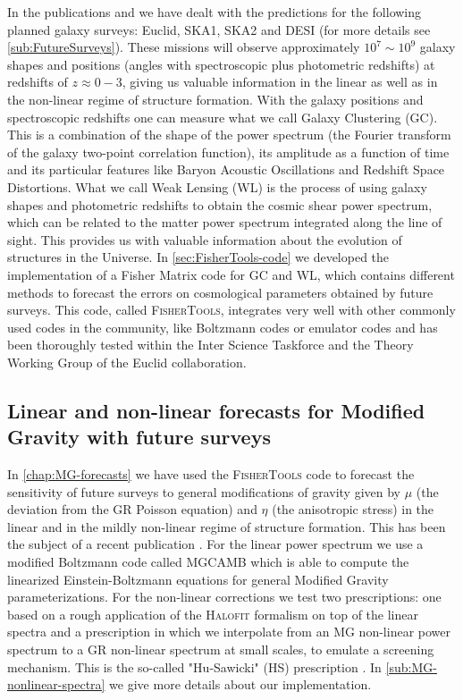 In the publications \cite{casas_fitting_2016} and \cite{casas_linear_2017} we have dealt with the predictions for the following planned galaxy surveys: Euclid, SKA1, SKA2 and DESI (for more details see \cref{sub:FutureSurveys}).
These missions will observe approximately $10^7 \sim 10^9$ galaxy shapes and positions (angles with spectroscopic plus photometric redshifts) at redshifts of $z \approx 0-3$, giving us valuable information
in the linear as well as in the non-linear regime of structure formation.
With the galaxy positions and spectroscopic redshifts one can measure what we call Galaxy Clustering (GC). This is 
a combination of the shape of the power spectrum (the Fourier transform of the galaxy two-point correlation function), 
its amplitude as a function of time and its particular features like Baryon Acoustic Oscillations and Redshift Space Distortions.
What we call Weak Lensing (WL) is the process of using galaxy shapes and photometric redshifts to obtain the cosmic shear power spectrum, which
can be related to the matter power spectrum integrated along the line of sight. This provides us with valuable information about the evolution
of structures in the Universe.
In \cref{sec:FisherTools-code} we developed the implementation of a Fisher Matrix code for GC and WL, which contains different methods 
to forecast the errors on cosmological parameters obtained by future surveys. This code, called \textsc{FisherTools}, integrates
very well with other commonly used codes in the community, like Boltzmann codes or emulator codes and has been thoroughly 
tested within the Inter Science Taskforce and the Theory Working Group of the Euclid collaboration.


\subsection*{Linear and non-linear forecasts for Modified Gravity with future surveys}

In \cref{chap:MG-forecasts} we have used the \textsc{FisherTools} code to 
forecast the sensitivity of future surveys to general modifications of gravity given by $\mu$ (the deviation from the GR Poisson equation) 
and $\eta$ (the anisotropic stress) in the linear and in the 
mildly non-linear regime of structure formation. This
has been the subject of a recent publication \cite{casas_linear_2017}.
For the linear power spectrum we use a modified Boltzmann code called \textsc{MGCAMB} \cite{hojjati_testing_2011} which is able to compute the linearized
Einstein-Boltzmann equations for general Modified Gravity parameterizations. For the non-linear corrections we test two prescriptions: one based on a rough application
of the \textsc{Halofit} \cite{smith_stable_2003} \cite{takahashi_revising_2012} formalism on top of the linear spectra and a prescription in which we interpolate
from an MG non-linear power spectrum to a GR non-linear spectrum at small scales, to emulate a screening mechanism. This is the 
so-called "Hu-Sawicki" (HS) prescription \cite{hu_parameterized_2007}. In  \cref{sub:MG-nonlinear-spectra} we give more details about our implementation.


